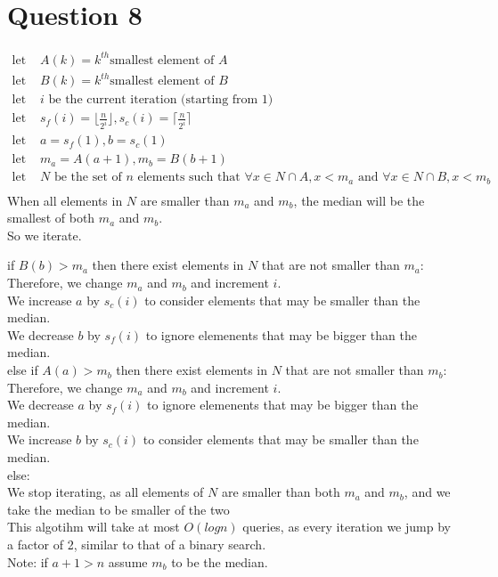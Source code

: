 \documentclass{article}
\begin{document}
\section*{Question 8}
\begin{align*}
    \text{let } &A(k) = k^{th} \text{smallest element of } A\\
    \text{let } &B(k) = k^{th} \text{smallest element of } B\\
    \text{let } &i \text{ be the current iteration (starting from 1)}\\
    \text{let } &s_f(i) = \lfloor\frac{n}{2^i}\rfloor, s_c(i) = \lceil\frac{n}{2^i}\rceil\\
    \text{let } &a = s_f(1), b = s_c(1)\\
    \text{let } &m_a = A(a + 1), m_b = B(b + 1)\\
    \text{let } &N \text{ be the set of } n \text{ elements such that } \forall x \in N \cap A, x < m_a \text{ and } \forall x \in N \cap B, x < m_b\\
\end{align*}
When all elements in $N$ are smaller than $m_a$ and $m_b$, the median will be the smallest of both $m_a$ and $m_b$.\\

\noindent
So we iterate.

\noindent
if $B(b) > m_a$ then there exist elements in $N$ that are not smaller than $m_a$:\\
    \indent Therefore, we change $m_a$ and $m_b$ and increment $i$.\\
    \indent We increase $a$ by $s_c(i)$ to consider elements that may be smaller than the median.\\
    \indent We decrease $b$ by $s_f(i)$ to ignore elemenents that may be bigger than the median.\\
else if $A(a) > m_b$ then there exist elements in $N$ that are not smaller than $m_b$:\\
    \indent Therefore, we change $m_a$ and $m_b$ and increment $i$.\\
    \indent We decrease $a$ by $s_f(i)$ to ignore elemenents that may be bigger than the median.\\
    \indent We increase $b$ by $s_c(i)$ to consider elements that may be smaller than the median.\\
else:\\
    \indent We stop iterating, as all elements of $N$ are smaller than both $m_a$ and $m_b$, and we take the median to be smaller of the two\\

\noindent This algotihm will take at most $O(logn)$ queries, as every iteration we jump by a factor of 2, similar to that of a binary search.\\

\noindent
Note: if $a + 1 > n$ assume $m_b$ to be the median.
\end{document}
